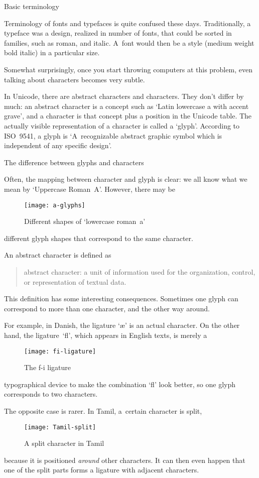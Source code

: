  {Basic terminology}

Terminology of fonts and typefaces is quite confused these
days. Traditionally, a typeface was a design, realized
in number of fonts, that could be sorted in families, such as roman,
and italic. A~font would then be a style (medium weight
bold italic) in a particular size. 

Somewhat surprisingly, once you start throwing computers at this
problem, even talking about characters becomes very subtle.

In Unicode, there are abstract characters and characters. They don't
differ by much: an abstract character is a concept such as `Latin
lowercase a with accent grave', and a character is that concept plus a
position in the Unicode table. The actually visible representation of
a character is called a `glyph'. According to
ISO~9541, a glyph is `A~recognizable abstract graphic
symbol which is independent of any specific design'.

 {The difference between glyphs and characters}

Often, the mapping between character and glyph is clear: we all know
what we mean by `Uppercase Roman~A'. However, there may be 
\begin{figure}
\texttt{[image: a-glyphs]}
\caption{Different shapes of `lowercase roman~a'}\label{fig:a-glyphs}
\end{figure}
different glyph shapes that correspond to the same character.

An abstract character is defined as
\begin{quotation}
abstract character: a unit of information used for the organization,
control, or representation of textual data.
\end{quotation}
This definition has some interesting consequences. Sometimes one glyph
can correspond to more than one character, and the other way around.

For example, in Danish, the ligature `\ae' is an actual character. On
the other hand, the
ligature~`fl', which appears in English texts, is merely a
\begin{figure}[ht]
\texttt{[image: fi-ligature]}
\caption{The f-i ligature}\label{fig:fi-ligature}
\end{figure}
typographical device to make the combination `f{}l' look better, so
one glyph corresponds to two characters.

The opposite case is rarer. In Tamil, a~certain character is split,
\begin{figure}
\texttt{[image: Tamil-split]}
\caption{A split character in Tamil}\label{fig:tamil-split}
\end{figure}
because it is positioned \emph{around} other characters. It can then
even happen that one of the split parts forms a ligature with adjacent
characters.

